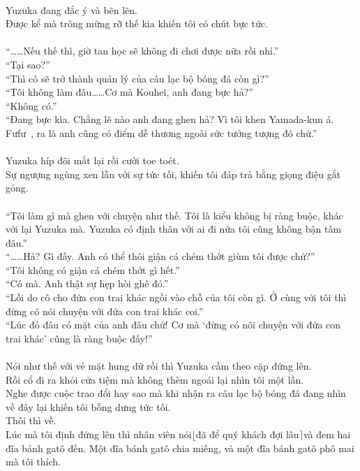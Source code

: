 \documentclass[12pt,a4paper, twosides]{book}
\begin{document}
\\
Yuzuka đang đắc ý và bẽn lẽn.\\
Được kể mà trông mừng rỡ thế kia khiến tôi có chút bực tức.\\
\\
“……Nếu thế thì, giờ tan học sẽ không đi chơi được nữa rồi nhỉ.”\\
“Tại sao?”\\
“Thì cô sẽ trở thành quản lý của câu lạc bộ bóng đá còn gì?”\\
“Tôi không làm đâu……Cơ mà Kouhei, anh đang bực hả?”\\
“Không có.”\\
“Đang bực kìa. Chẳng lẽ nào anh đang ghen hả? Vì tôi khen Yamada-kun á. Fưfư~, ra là anh cũng có điểm dễ thương ngoài sức tưởng tượng đó chứ.”\\
\\
Yuzuka híp đôi mắt lại rồi cười toe toét.\\
Sự ngượng ngùng xen lẫn với sự tức tối, khiến tôi đáp trả bằng giọng điệu gắt gỏng.\\
\\
“Tôi làm gì mà ghen với chuyện như thế. Tôi là kiểu không bị ràng buộc, khác với lại Yuzuka mà. Yuzuka có định thân với ai đi nữa tôi cũng không bận tâm đâu.”\\
“……Hả? Gì đấy. Anh có thể thôi giận cá chém thớt giùm tôi được chứ?”\\
“Tôi không có giận cá chém thớt gì hết.”\\
“Có mà. Anh thật sự hẹp hòi ghê đó.”\\
“Lỗi do cô cho đứa con trai khác ngồi vào chỗ của tôi còn gì. Ở cùng với tôi thì đừng có nói chuyện với đứa con trai khác coi.”\\
“Lúc đó đâu có mặt của anh đâu chứ! Cơ mà ‘đừng có nói chuyện với đứa con trai khác’ cũng là ràng buộc đấy!”\\
\\
Nói như thế với vẻ mặt hung dữ rồi thì Yuzuka cầm theo cặp đứng lên.\\
Rồi cổ đi ra khỏi cửa tiệm mà không thèm ngoái lại nhìn tôi một lần.\\
Nghe được cuộc trao đổi hay sao mà khi nhận ra câu lạc bộ bóng đá đang nhìn về đây lại khiến tôi bỗng dưng tức tối.\\
Thôi thì về.\\
Lúc mà tôi định đứng lên thì nhân viên nói$\lfloor$đã để quý khách đợi lâu$\rceil$và đem hai đĩa bánh gatô đến. Một đĩa bánh gatô chia miếng, và một đĩa bánh gatô phô mai mà tôi thích.\\
\end{document}
